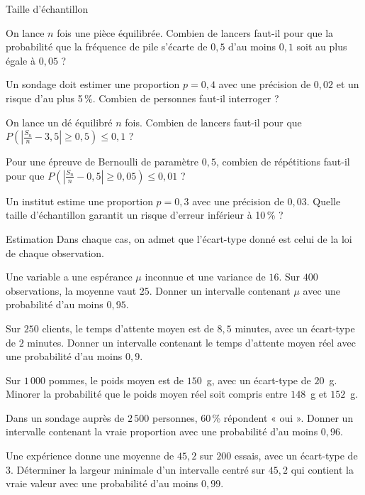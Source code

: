 \begin{exercice}[2]{Taille d'échantillon}
\begin{questions}
  \item On lance $n$ fois une pièce équilibrée. Combien de lancers faut-il pour que la probabilité que la fréquence de pile s'écarte
    de $0{,}5$ d'au moins $0{,}1$ soit au plus égale à $0{,}05$ ?
  \item Un sondage doit estimer une proportion $p=0{,}4$ avec une précision de $0{,}02$ et un risque d'au plus 5\,\%. Combien de
    personnes faut-il interroger ?
  \item On lance un dé équilibré $n$ fois. Combien de lancers faut-il pour que $P\left(\left|\frac{S_n}{n}-3{,}5\right|\geq0{,}5\right)\leq0{,}1$ ?
  \item Pour une épreuve de Bernoulli de paramètre $0{,}5$, combien de répétitions faut-il pour que
    $P\left(\left|\frac{S_n}{n}-0{,}5\right|\geq0{,}05\right)\leq0{,}01$ ?
  \item Un institut estime une proportion $p=0{,}3$ avec une précision de $0{,}03$. Quelle taille d'échantillon garantit un risque
    d'erreur inférieur à 10\,\% ?
\end{questions}
\end{exercice}

\begin{exercice}[2]{Estimation}
Dans chaque cas, on admet que l'écart-type donné est celui de la loi de chaque observation.
\begin{questions}
  \item Une variable a une espérance $\mu$ inconnue et une variance de $16$. Sur $400$ observations, la moyenne vaut $25$. Donner un
    intervalle contenant $\mu$ avec une probabilité d'au moins $0{,}95$.
  \item Sur $250$ clients, le temps d'attente moyen est de $8{,}5$ minutes, avec un écart-type de $2$ minutes. Donner un intervalle
    contenant le temps d'attente moyen réel avec une probabilité d'au moins $0{,}9$.
  \item Sur $1\,000$ pommes, le poids moyen est de $150$~g, avec un écart-type de $20$~g. Minorer la probabilité que le poids moyen
    réel soit compris entre $148$~g et $152$~g.
  \item Dans un sondage auprès de $2\,500$ personnes, 60\,\% répondent « oui ». Donner un intervalle contenant la vraie proportion
    avec une probabilité d'au moins $0{,}96$.
  \item Une expérience donne une moyenne de $45{,}2$ sur $200$ essais, avec un écart-type de $3$. Déterminer la largeur minimale d'un
    intervalle centré sur $45{,}2$ qui contient la vraie valeur avec une probabilité d'au moins $0{,}99$.
\end{questions}
\end{exercice}


